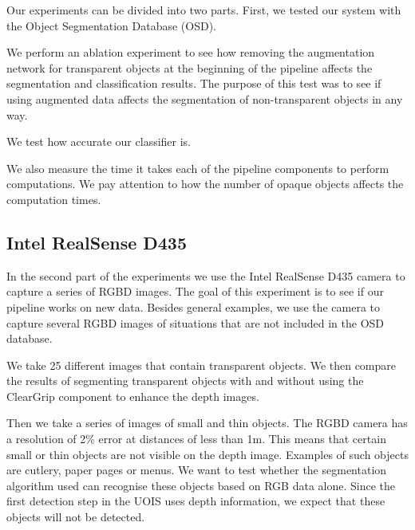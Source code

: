 \documentclass[10pt,twocolumn,letterpaper]{article}
\begin{document}
Our experiments can be divided into two parts. First, we tested our system with the Object Segmentation Database (OSD).

We perform an ablation experiment to see how removing the augmentation network for transparent objects at the beginning of the pipeline affects the segmentation and classification results. The purpose of this test was to see if using augmented data affects the segmentation of non-transparent objects in any way.

We test how accurate our classifier is.

We also measure the time it takes each of the pipeline components to perform computations. We pay attention to how the number of opaque objects affects the computation times.

\subsection{Intel RealSense D435}

In the second part of the experiments we use the Intel RealSense D435 camera to capture a series of RGBD images. The goal of this experiment is to see if our pipeline works on new data. Besides general examples, we use the camera to capture several RGBD images of situations that are not included in the OSD database.

We take 25 different images that contain transparent objects. We then compare the results of segmenting transparent objects with and without using the ClearGrip component to enhance the depth images.

Then we take a series of images of small and thin objects. The RGBD camera has a resolution of 2\% error at distances of less than 1m. This means that certain small or thin objects are not visible on the depth image. Examples of such objects are cutlery, paper pages or menus. We want to test whether the segmentation algorithm used can recognise these objects based on RGB data alone. Since the first detection step in the UOIS uses depth information, we expect that these objects will not be detected.













{\small


}
\end{document}
